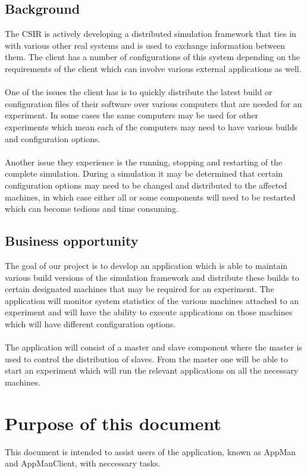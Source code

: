 \documentclass[a4paper,12pt,final]{article}
\begin{document}
\subsection{Background}
The CSIR is actively developing a distributed simulation framework that ties
in with various other real systems and is used to exchange information
between them. The client has a number of configurations of this system
depending on the requirements of the client which can involve various
external applications as well.\\
\textbf{\\}
One of the issues the client has is to quickly distribute the latest build or
configuration files of their software over various computers that are needed
for an experiment. In some cases the same computers may be used for other
experiments which mean each of the computers may need to have various
builds and configuration options.\\
\textbf{\\}
Another issue they experience is the running, stopping and restarting of
the complete simulation. During a simulation it may be determined that
certain configuration options may need to be changed and distributed to the
affected machines, in which case either all or some components will need to
be restarted which can become tedious and time consuming.
\subsection{Business opportunity}
The goal of our project is to develop an application which is able to maintain
various build versions of the simulation framework and distribute these builds
to certain designated machines that may be required for an experiment. The
application will monitor system statistics of the various machines attached
to an experiment and will have the ability to execute applications on those
machines which will have different configuration options.\\
\textbf{\\}
The application will consist of a master and slave component where the
master is used to control the distribution of slaves. From the master one will
be able to start an experiment which will run the relevant applications on all
the necessary machines.


\newpage
\section{Purpose of this document}
This document is intended to assist users of the application, known as AppMan and AppManClient, with neccessary tasks.
\end{document}
